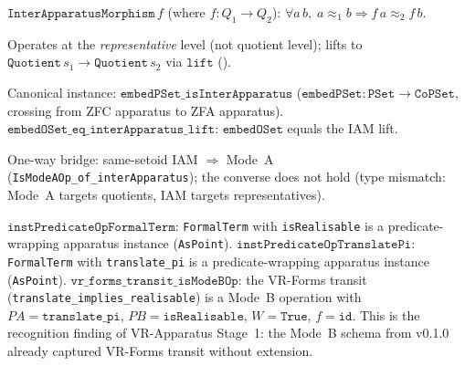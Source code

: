 \begin{definition}[InterApparatusMorphism]
\label{def:IAM}
\leanok
{}
$\texttt{InterApparatusMorphism}\,f$ (where $f : Q_1 \to Q_2$):
$\forall a\,b,\; a \approx_1 b \Rightarrow f\,a \approx_2 f\,b$.

Operates at the \emph{representative} level (not quotient level); lifts
to $\texttt{Quotient}\,s_1 \to \texttt{Quotient}\,s_2$ via
$\texttt{lift}$ ().

Canonical instance: $\texttt{embedPSet\_isInterApparatus}$
($\texttt{embedPSet} : \texttt{PSet} \to \texttt{CoPSet}$, crossing
from ZFC apparatus to ZFA apparatus).
$\texttt{embedOSet\_eq\_interApparatus\_lift}$: $\texttt{embedOSet}$
equals the IAM lift.

One-way bridge: same-setoid IAM $\Rightarrow$ Mode~A
(\texttt{IsModeAOp\_of\_interApparatus}); the converse does not hold
(type mismatch: Mode~A targets quotients, IAM targets representatives).
\end{definition}

\begin{definition}
\label{def:forms_instances}
\leanok
{}
$\texttt{instPredicateOpFormalTerm}$:
\texttt{FormalTerm} with \texttt{isRealisable} is a predicate-wrapping
apparatus instance (\texttt{AsPoint}).
$\texttt{instPredicateOpTranslatePi}$:
\texttt{FormalTerm} with \texttt{translate\_pi} is a predicate-wrapping
apparatus instance (\texttt{AsPoint}).
$\texttt{vr\_forms\_transit\_isModeBOp}$: the VR-Forms transit
(\texttt{translate\_implies\_realisable}) is a Mode~B operation with
$PA = \texttt{translate\_pi}$, $PB = \texttt{isRealisable}$,
$W = \texttt{True}$, $f = \texttt{id}$.
This is the recognition finding of VR-Apparatus Stage~1: the Mode~B
schema from v0.1.0 already captured VR-Forms transit without extension.
\end{definition}

